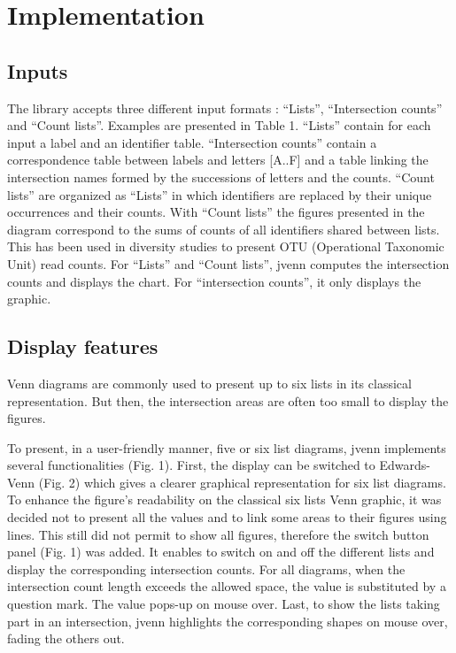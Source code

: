 \documentclass{bmcart}
\begin{document}
\section*{Implementation}

\subsection*{Inputs}

The library accepts three different input formats : ``Lists'', ``Intersection
counts'' and ``Count lists''. Examples are presented in Table 1. ``Lists'' contain
for each input a label and an identifier table. ``Intersection counts'' contain a
correspondence table between labels and letters [A..F] and a table linking the
intersection names formed by the successions of letters and the counts. ``Count
lists'' are organized as ``Lists'' in which identifiers are replaced by their
unique occurrences and their counts. With ``Count lists'' the figures presented
in the diagram correspond to the sums of counts of all identifiers shared
between lists. This has been used in diversity studies to present OTU
(Operational Taxonomic Unit) read counts. For ``Lists'' and ``Count lists'',
jvenn computes the intersection counts and displays the chart. For
``intersection counts'', it only displays the graphic.

\subsection*{Display features}

Venn diagrams are commonly used to present up to six lists in its classical 
representation. But then, the intersection areas are often too small to display 
the figures.

To present, in a user-friendly manner, five or six list diagrams, jvenn implements
several functionalities (Fig. 1). First, the display can be switched to
Edwards-Venn (Fig. 2) which gives a clearer graphical representation for six list diagrams. To
enhance the figure's readability on the classical six lists Venn graphic, it was
decided not to present all the values and to link some areas to their figures
using lines. This still did not permit to show all figures, therefore the switch
button panel (Fig. 1) was added. It enables to switch on and off the different lists
and display the corresponding intersection counts. For all diagrams, when the 
intersection count length exceeds the allowed space, the value is substituted by
a question mark. The value pops-up on mouse over. Last, to show the lists taking
part in an intersection, jvenn highlights the corresponding shapes on mouse
over, fading the others out.
\end{document}
